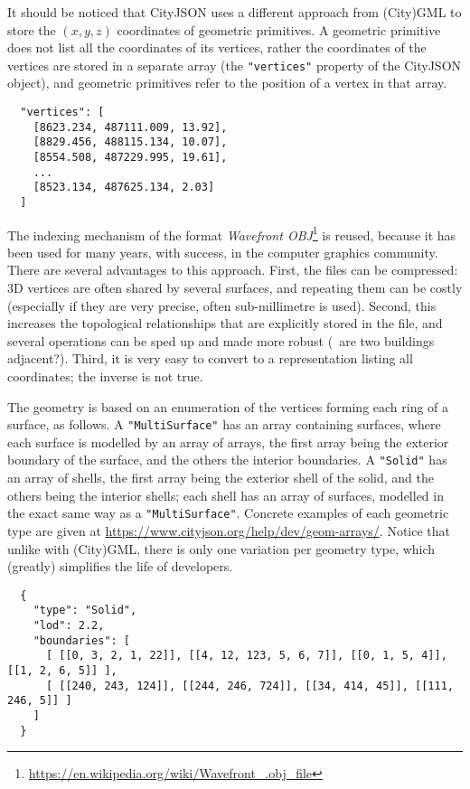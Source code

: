 It should be noticed that CityJSON uses a different approach from (City)GML to store the $(x,y,z)$ coordinates of geometric primitives.
A geometric primitive does not list all the coordinates of its vertices, rather the coordinates of the vertices are stored in a separate array (the \texttt{"vertices"} property of the CityJSON object), and geometric primitives refer to the position of a vertex in that array.
\begin{lstlisting}
  "vertices": [
    [8623.234, 487111.009, 13.92],
    [8829.456, 488115.134, 10.07],
    [8554.508, 487229.995, 19.61],
    ...
    [8523.134, 487625.134, 2.03]
  ]
\end{lstlisting}
The indexing mechanism of the format \emph{Wavefront OBJ}\footnote{\url{https://en.wikipedia.org/wiki/Wavefront_.obj_file}} is reused, because it has been used for many years, with success, in the computer graphics community.
There are several advantages to this approach.
First, the files can be compressed: 3D vertices are often shared by several surfaces, and repeating them can be costly (especially if they are very precise, often sub-millimetre is used).
Second, this increases the topological relationships that are explicitly stored in the file, and several operations can be sped up and made more robust (\eg\ are two buildings adjacent?).
Third, it is very easy to convert to a representation listing all coordinates; the inverse is not true. 

%

The geometry is based on an enumeration of the vertices forming each ring of a surface, as follows.
A \texttt{"MultiSurface"} has an array containing surfaces, where each surface is modelled by an array of arrays, the first array being the exterior boundary of the surface, and the others the interior boundaries.
A \texttt{"Solid"} has an array of shells, the first array being the exterior shell of the solid, and the others being the interior shells; each shell has an array of surfaces, modelled in the exact same way as a \texttt{"MultiSurface"}.
Concrete examples of each geometric type are given at \url{https://www.cityjson.org/help/dev/geom-arrays/}.
Notice that unlike with (City)GML, there is only one variation per geometry type, which (greatly) simplifies the life of developers.
\begin{lstlisting}
  {
    "type": "Solid",
    "lod": 2.2,
    "boundaries": [
      [ [[0, 3, 2, 1, 22]], [[4, 12, 123, 5, 6, 7]], [[0, 1, 5, 4]], [[1, 2, 6, 5]] ], 
      [ [[240, 243, 124]], [[244, 246, 724]], [[34, 414, 45]], [[111, 246, 5]] ] 
    ]
  }
\end{lstlisting}


